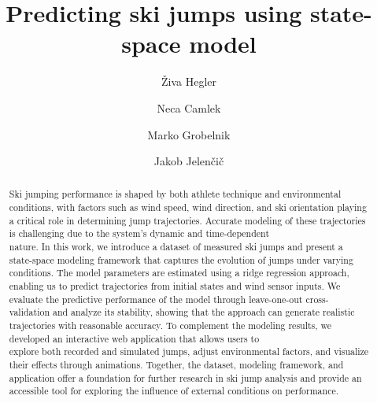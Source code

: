 \documentclass[sigconf,natbib=false, language=english]{acmart}
\begin{document}
\title[Ski Jumping Simulation]{Predicting ski jumps using state-space model}


\author{Živa Hegler}


\author{Neca Camlek}

\author{Marko Grobelnik}

\author{Jakob Jelenčič}

\renewcommand{\shortauthors}{Ž. Hegler, N. Camlek et al.}


\begin{abstract}

Ski jumping performance is shaped by both athlete technique and environmental 
conditions, with factors such as wind speed, wind direction, and ski orientation 
playing a critical role in determining jump trajectories. Accurate modeling of 
these trajectories is challenging due to the system’s dynamic and time-dependent\\ 
nature. In this work, we introduce a dataset of measured ski jumps and present a 
state-space modeling framework that captures the evolution of jumps under varying 
conditions. The model parameters are estimated using a ridge regression approach, 
enabling us to predict trajectories from initial states and wind sensor inputs. 
We evaluate the predictive performance of the model through leave-one-out cross-validation 
and analyze its stability, showing that the approach can generate realistic trajectories 
with reasonable accuracy. To complement the modeling results, we developed an interactive 
web application that allows users to \\
explore both recorded and simulated jumps, adjust 
environmental factors, and visualize their effects through animations. Together, the 
dataset, modeling framework, and application offer a foundation for further research in 
ski jump analysis and provide an accessible tool for exploring the influence of external 
conditions on performance.

\end{abstract}

\end{document}
